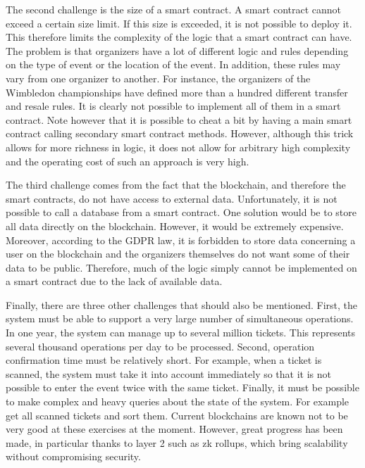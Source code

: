 \documentclass[a4paper,11pt,oneside]{report}
\begin{document}
The second challenge is the size of a smart contract. A smart contract cannot exceed a certain size limit. If this size is exceeded, it is not possible to deploy it. This therefore limits the complexity of the logic that a smart contract can have. The problem is that organizers have a lot of different logic and rules depending on the type of event or the location of the event. In addition, these rules may vary from one organizer to another. For instance, the organizers of the Wimbledon championships have defined more than a hundred different transfer and resale rules. It is clearly not possible to implement all of them in a smart contract. Note however that it is possible to cheat a bit by having a main smart contract calling secondary smart contract methods. However, although this trick allows for more richness in logic, it does not allow for arbitrary high complexity and the operating cost of such an approach is very high.

The third challenge comes from the fact that the blockchain, and therefore the smart contracts, do not have access to external data. Unfortunately, it is not possible to call a database from a smart contract. One solution would be to store all data directly on the blockchain. However, it would be extremely expensive. Moreover, according to the GDPR law, it is forbidden to store data concerning a user on the blockchain and the organizers themselves do not want some of their data to be public. Therefore, much of the logic simply cannot be implemented on a smart contract due to the lack of available data.

Finally, there are three other challenges that should also be mentioned. First, the system must be able to support a very large number of simultaneous operations. In one year, the system can manage up to several million tickets. This represents several thousand operations per day to be processed. Second, operation confirmation time must be relatively short. For example, when a ticket is scanned, the system must take it into account immediately so that it is not possible to enter the event twice with the same ticket. Finally, it must be possible to make complex and heavy queries about the state of the system. For example get all scanned tickets and sort them. Current blockchains are known not to be very good at these exercises at the moment. However, great progress has been made, in particular thanks to layer 2 such as zk rollups, which bring scalability without compromising security.
\end{document}
